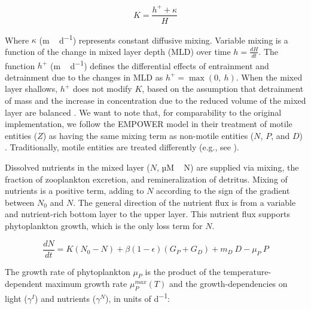 \documentclass[journal abbreviation, manuscript]{copernicus}
\begin{document}
\begin{equation}
    K = \frac{h^{+} + \kappa}{H}
\end{equation}

Where $\kappa$ (\unit{m\,d^{−1}}) represents constant diffusive mixing. Variable mixing is a function of the change in mixed layer depth (MLD) over time $h = \frac{dH}{dt}$. The function $h^{+}$ (\unit{m\,d^{−1}}) defines the differential effects of entrainment and detrainment due to the changes in MLD as $h^{+} = \max(0, \ h)$. When the mixed layer shallows, $h^{+}$ does not modify $K$, based on the assumption that detrainment of mass and the increase in concentration due to the reduced volume of the mixed layer are balanced \citep{Evans1985ACycles}. We want to note that, for comparability to the original implementation, we follow the EMPOWER model in their treatment of motile entities ($Z$) as having the same mixing term as non-motile entities ($N$, $P$, and $D$) \citep{Anderson2015c}. Traditionally, motile entities are treated differently (e.g., see \citep{Fasham1990a}).

Dissolved nutrients in the mixed layer ($N$, \unit{µM\,N}) are supplied via mixing, the fraction of zooplankton excretion, and remineralization of detritus. Mixing of nutrients is a positive term, adding to $N$ according to the sign of the gradient between $N_0$ and $N$. The general direction of the nutrient flux is from a variable and nutrient-rich bottom layer to the upper layer. This nutrient flux supports phytoplankton growth, which is the only loss term for $N$.

\begin{equation}
    \label{Eq:EmpowerNuts}
    \frac{d N}{d t} = 
    K (N_0 - N) %
    + \beta(1 - \epsilon)(G_P + G_D) %
    + m_D \ D %
    - \mu_{P} \ P %
\end{equation}

The growth rate of phytoplankton $\mu_{P}$ is the product of the temperature-dependent maximum growth rate $\mu_P^{max}(T)$ and the growth-dependencies on light ($\gamma^{I}$) and nutrients ($\gamma^{N}$), in units of \unit{d^{−1}}: 
\end{document}
